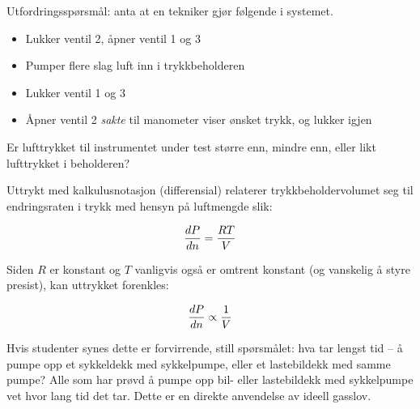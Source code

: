 \vskip 10pt

Utfordringsspørsmål: anta at en tekniker gjør følgende i systemet.

\begin{itemize}
\item{} Lukker ventil 2, åpner ventil 1 og 3
\item{} Pumper flere slag luft inn i trykkbeholderen
\item{} Lukker ventil 1 og 3
\item{} Åpner ventil 2 {\it sakte} til manometer viser ønsket trykk, og lukker igjen
\end{itemize}

Er lufttrykket til instrumentet under test større enn, mindre enn, eller likt lufttrykket i beholderen?







Uttrykt med kalkulusnotasjon (differensial) relaterer trykkbeholdervolumet seg til endringsraten i trykk med hensyn på luftmengde slik:

$${dP \over dn} = {RT \over V}$$

Siden $R$ er konstant og $T$ vanligvis også er omtrent konstant (og vanskelig å styre presist), kan uttrykket forenkles:

$${dP \over dn} \propto {1 \over V}$$

Hvis studenter synes dette er forvirrende, still spørsmålet: hva tar lengst tid -- å pumpe opp et sykkeldekk med sykkelpumpe, eller et lastebildekk med samme pumpe?  Alle som har prøvd å pumpe opp bil- eller lastebildekk med sykkelpumpe vet hvor lang tid det tar.  Dette er en direkte anvendelse av ideell gasslov.


